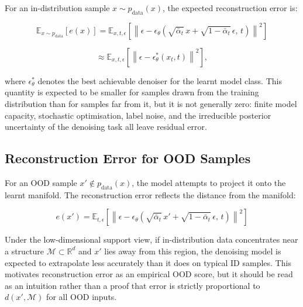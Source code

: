 For an in-distribution sample $x \sim p_{\text{data}}(x)$, the expected reconstruction error is:

\begin{equation}
\label{eq:appB:id-error}
\mathbb{E}_{x \sim p_{\text{data}}}[e(x)] = \mathbb{E}_{x,t,\epsilon} \left[ \left\| \epsilon - \epsilon_\theta\!\left( \sqrt{\bar{\alpha}_t}\, x + \sqrt{1 - \bar{\alpha}_t}\, \epsilon,\, t \right) \right\|^2 \right]
\end{equation}

\begin{equation}
\label{eq:appB:id-error-approx}
\approx \mathbb{E}_{x,t,\epsilon} \left[ \left\| \epsilon - \epsilon_\theta^*(x_t,t) \right\|^2 \right],
\end{equation}

where $\epsilon_\theta^*$ denotes the best achievable denoiser for the learnt model class. This quantity is expected to be smaller for samples drawn from the training distribution than for samples far from it, but it is not generally zero: finite model capacity, stochastic optimisation, label noise, and the irreducible posterior uncertainty of the denoising task all leave residual error.


\subsection{Reconstruction Error for OOD Samples}
\label{app:math-derivations:reconstruction:ood}

For an OOD sample $x' \notin p_{\text{data}}(x)$, the model attempts to project it onto the learnt manifold. The reconstruction error reflects the distance from the manifold:

\begin{equation}
\label{eq:appB:ood-error}
e(x') = \mathbb{E}_{t,\epsilon} \left[ \left\| \epsilon - \epsilon_\theta\!\left( \sqrt{\bar{\alpha}_t}\, x' + \sqrt{1 - \bar{\alpha}_t}\, \epsilon,\, t \right) \right\|^2 \right]
\end{equation}

Under the low-dimensional support view, if in-distribution data concentrates near a structure $\mathcal{M} \subset \mathbb{R}^d$ and $x'$ lies away from this region, the denoising model is expected to extrapolate less accurately than it does on typical ID samples. This motivates reconstruction error as an empirical OOD score, but it should be read as an intuition rather than a proof that error is strictly proportional to $d(x', \mathcal{M})$ for all OOD inputs.

